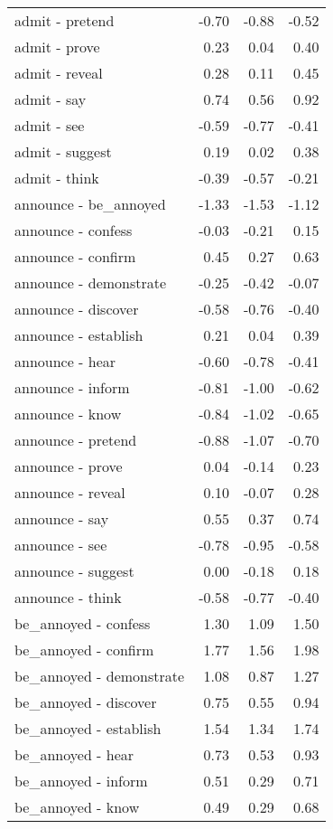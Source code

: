 \begin{longtable}{lrrr}
  admit - pretend & -0.70 & -0.88 & -0.52 \\ 
  admit - prove & 0.23 & 0.04 & 0.40 \\ 
  admit - reveal & 0.28 & 0.11 & 0.45 \\ 
  admit - say & 0.74 & 0.56 & 0.92 \\ 
  admit - see & -0.59 & -0.77 & -0.41 \\ 
  admit - suggest & 0.19 & 0.02 & 0.38 \\ 
  admit - think & -0.39 & -0.57 & -0.21 \\ 
  announce - be_annoyed & -1.33 & -1.53 & -1.12 \\ 
  announce - confess & -0.03 & -0.21 & 0.15 \\ 
  announce - confirm & 0.45 & 0.27 & 0.63 \\ 
  announce - demonstrate & -0.25 & -0.42 & -0.07 \\ 
  announce - discover & -0.58 & -0.76 & -0.40 \\ 
  announce - establish & 0.21 & 0.04 & 0.39 \\ 
  announce - hear & -0.60 & -0.78 & -0.41 \\ 
  announce - inform & -0.81 & -1.00 & -0.62 \\ 
  announce - know & -0.84 & -1.02 & -0.65 \\ 
  announce - pretend & -0.88 & -1.07 & -0.70 \\ 
  announce - prove & 0.04 & -0.14 & 0.23 \\ 
  announce - reveal & 0.10 & -0.07 & 0.28 \\ 
  announce - say & 0.55 & 0.37 & 0.74 \\ 
  announce - see & -0.78 & -0.95 & -0.58 \\ 
  announce - suggest & 0.00 & -0.18 & 0.18 \\ 
  announce - think & -0.58 & -0.77 & -0.40 \\ 
  be_annoyed - confess & 1.30 & 1.09 & 1.50 \\ 
  be_annoyed - confirm & 1.77 & 1.56 & 1.98 \\ 
  be_annoyed - demonstrate & 1.08 & 0.87 & 1.27 \\ 
  be_annoyed - discover & 0.75 & 0.55 & 0.94 \\ 
  be_annoyed - establish & 1.54 & 1.34 & 1.74 \\ 
  be_annoyed - hear & 0.73 & 0.53 & 0.93 \\ 
  be_annoyed - inform & 0.51 & 0.29 & 0.71 \\ 
  be_annoyed - know & 0.49 & 0.29 & 0.68 \\ 

\end{longtable}
